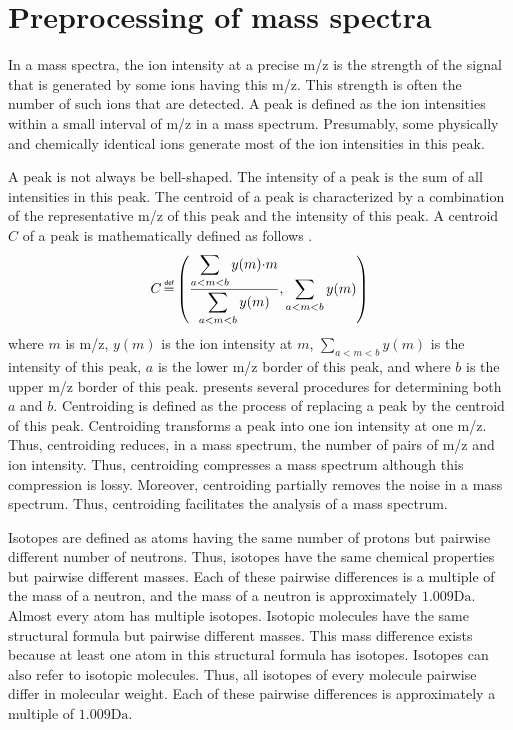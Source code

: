 
\section{Preprocessing of mass spectra} 
\label{sec:MS:prep}

In a mass spectra, the ion intensity at a precise \gls{m/z} is the strength of the signal that is generated by some ions having this \gls{m/z}.
This strength is often the number of such ions that are detected.
A peak is defined as the ion intensities within a small interval of \gls{m/z} in a mass spectrum.
Presumably, some physically and chemically identical ions generate most of the ion intensities in this peak.

A peak is not always be bell-shaped.
The intensity of a peak is the sum of all intensities in this peak. 
The centroid of a peak is characterized by a combination of the representative \gls{m/z} of this peak and the intensity of this peak.
A centroid \(C\) of a peak is mathematically defined as follows \cite{urban2014fundamental}.
\[C \isdefinedas %
\left(\frac{\displaystyle\sum_{a<m<b} y(m){\cdot}m}{\displaystyle\sum_{a<m<b} y(m)}, \sum_{a<m<b} y(m) \right)\]
	where \(m\) is \gls{m/z}, 
	\(y(m)\) is the ion intensity at \(m\), 
	\(\sum_{a<m<b} y(m)\) is the intensity of this peak, 
	\(a\) is the lower \gls{m/z} border of this peak, 
	and where \(b\) is the upper \gls{m/z} border of this peak.
\cite{urban2014fundamental} presents several procedures for determining both \(a\) and \(b\). 
Centroiding is defined as the process of replacing a peak by the centroid of this peak.
Centroiding transforms a peak into one ion intensity at one \gls{m/z}.
Thus, centroiding reduces, in a mass spectrum, the number of pairs of \gls{m/z} and ion intensity.
Thus, centroiding compresses a mass spectrum although this compression is lossy.
Moreover, centroiding partially removes the noise in a mass spectrum.
Thus, centroiding facilitates the analysis of a mass spectrum.

Isotopes are defined as atoms having the same number of protons but pairwise different number of neutrons.
Thus, isotopes have the same chemical properties but pairwise different masses.
Each of these pairwise differences is a multiple of the mass of a neutron, and the mass of a neutron is approximately \(1.009\si{\dalton}\).
Almost every atom has multiple isotopes.
Isotopic molecules have the same structural formula but pairwise different masses.
This mass difference exists because at least one atom in this structural formula has isotopes.
Isotopes can also refer to isotopic molecules. 
Thus, all isotopes of every molecule pairwise differ in molecular weight.
Each of these pairwise differences is approximately a multiple of \(1.009\si{\dalton}\).

